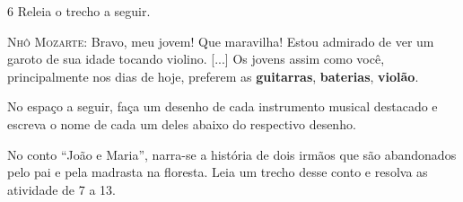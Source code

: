 \num{6} Releia o trecho a seguir.

\begin{myquote}
\textsc{Nhô Mozarte}: Bravo, meu jovem! Que maravilha! Estou admirado de
ver um garoto de sua idade tocando violino. {[}...{]} Os jovens assim
como você, principalmente nos dias de hoje, preferem as
\textbf{guitarras}, \textbf{baterias}, \textbf{violão}.
\end{myquote}

No espaço a seguir, faça um desenho de cada instrumento musical
destacado e escreva o nome de cada um deles abaixo do respectivo desenho.

\begin{mdframed}[linewidth=2pt,linecolor=salmao,roundcorner=20pt]
\vspace{12cm}
\end{mdframed}

No conto ``João e Maria'', narra-se a história de dois irmãos que são
abandonados pelo pai e pela madrasta na floresta. Leia um trecho desse
conto e resolva as atividade de 7 a 13.


